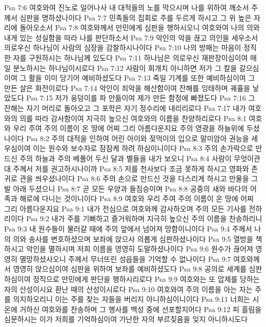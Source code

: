 Psa 7:6  여호와여 진노로 일어나사 내 대적들의 노를 막으시며 나를 위하여 깨소서 주께서 심판을 명하셨나이다
Psa 7:7  민족들의 집회로 주를 두르게 하시고 그 위 높은 자리에 돌아오소서
Psa 7:8  여호와께서 만민에게 심판을 행하시오니 여호와여 나의 의와 내게 있는 성실함을 따라 나를 판단하소서
Psa 7:9  악인의 악을 끊고 의인을 세우소서 의로우신 하나님이 사람의 심장을 감찰하시나이다
Psa 7:10  나의 방패는 마음이 정직한 자를 구원하시는 하나님께 있도다
Psa 7:11  하나님은 의로우신 재판장이심이여 매일 분노하시는 하나님이시로다
Psa 7:12  사람이 회개치 아니하면 저가 그 칼을 갈으심이여 그 활을 이미 당기어 예비하셨도다
Psa 7:13  죽일 기계를 또한 예비하심이여 그 만든 살은 화전이로다
Psa 7:14  악인이 죄악을 해산함이여 잔해를 잉태하며 궤휼을 낳았도다
Psa 7:15  저가 웅덩이를 파 만듦이여 제가 만든 함정에 빠졌도다
Psa 7:16  그 잔해는 자기 머리로 돌아오고 그 포학은 자기 정수리에 내리리로다
Psa 7:17  내가 여호와의 의를 따라 감사함이여 지극히 높으신 여호와의 이름을 찬양하리로다
Psa 8:1  여호와 우리 주여 주의 이름이 온 땅에 어찌 그리 아름다운지요 주의 영광을 하늘위에 두셨나이다
Psa 8:2  주의 대적을 인하여 어린 아이와 젖먹이의 입으로 말미암아 권능을 세우심이여 이는 원수와 보수자로 잠잠케 하려 하심이니이다
Psa 8:3  주의 손가락으로 만드신 주의 하늘과 주의 베풀어 두신 달과 별들을 내가 보오니
Psa 8:4  사람이 무엇이관대 주께서 저를 권고하시나이까
Psa 8:5  저를 천사보다 조금 못하게 하시고 영화와 존귀로 관을 씌우셨나이다
Psa 8:6  주의 손으로 만드신 것을 다스리게 하시고 만물을 그 발 아래 두셨으니
Psa 8:7  곧 모든 우양과 들짐승이며
Psa 8:8  공중의 새와 바다의 어족과 해로에 다니는 것이니이다
Psa 8:9  여호와 우리 주여 주의 이름이 온 땅에 어찌 그리 아름다운지요
Psa 9:1  내가 전심으로 여호와께 감사하오며 주의 모든 기사를 전하리이다
Psa 9:2  내가 주를 기뻐하고 즐거워하며 지극히 높으신 주의 이름을 찬송하리니
Psa 9:3  내 원수들이 물러갈 때에 주의 앞에서 넘어져 망함이니이다
Psa 9:4  주께서 나의 의와 송사를 변호하셨으며 보좌에 앉으사 의롭게 심판하셨나이다
Psa 9:5  열방을 책하시고 악인을 멸하시며 저희 이름을 영영히 도말하셨나이다
Psa 9:6  원수가 끊어져 영영히 멸망하셨사오니 주께서 무너뜨린 성읍들을 기억할 수 없나이다
Psa 9:7  여호와께서 영영히 앉으심이여 심판을 위하여 보좌를 예비하셨도다
Psa 9:8  공의로 세계를 심판하심이여 정직으로 만민에게 판단을 행하시리로다
Psa 9:9  여호와는 또 압제를 당하는 자의 산성이시요 환난 때의 산성이시로다
Psa 9:10  여호와여 주의 이름을 아는 자는 주를 의지하오리니 이는 주를 찾는 자들을 버리지 아니하심이니이다
Psa 9:11  너희는 시온에 거하신 여호와를 찬송하며 그 행사를 백성 중에 선포할지어다
Psa 9:12  피 흘림을 심문하시는 이가 저희를 기억하심이여 가난한 자의 부르짖음을 잊지 아니하시도다
